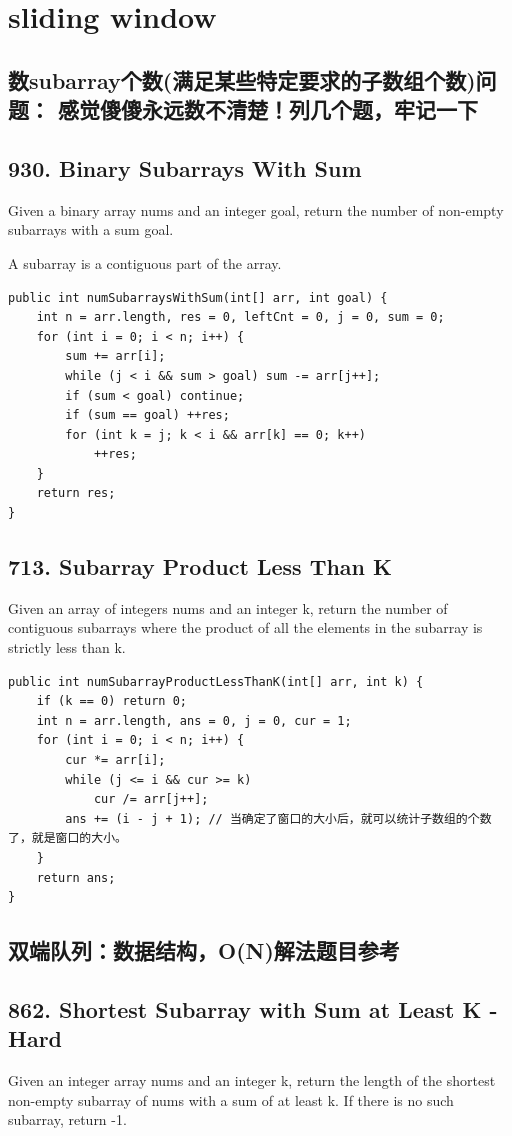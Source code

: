 \documentclass[9pt, b5paaper]{book}
\begin{document}
\chapter{sliding window}
\label{sec-12}
\section{数subarray个数(满足某些特定要求的子数组个数)问题： 感觉傻傻永远数不清楚！列几个题，牢记一下}
\label{sec-12-1}
\section{930. Binary Subarrays With Sum}
\label{sec-12-2}
Given a binary array nums and an integer goal, return the number of non-empty subarrays with a sum goal.

A subarray is a contiguous part of the array.
\begin{verbatim}
public int numSubarraysWithSum(int[] arr, int goal) { 
    int n = arr.length, res = 0, leftCnt = 0, j = 0, sum = 0;
    for (int i = 0; i < n; i++) {
        sum += arr[i];
        while (j < i && sum > goal) sum -= arr[j++];
        if (sum < goal) continue;
        if (sum == goal) ++res;
        for (int k = j; k < i && arr[k] == 0; k++) 
            ++res;
    }
    return res;
}
\end{verbatim}
\section{713. Subarray Product Less Than K}
\label{sec-12-3}
Given an array of integers nums and an integer k, return the number of contiguous subarrays where the product of all the elements in the subarray is strictly less than k.
\begin{verbatim}
public int numSubarrayProductLessThanK(int[] arr, int k) {
    if (k == 0) return 0;
    int n = arr.length, ans = 0, j = 0, cur = 1;
    for (int i = 0; i < n; i++) {
        cur *= arr[i];
        while (j <= i && cur >= k) 
            cur /= arr[j++];
        ans += (i - j + 1); // 当确定了窗口的大小后，就可以统计子数组的个数了，就是窗口的大小。
    }
    return ans;
}
\end{verbatim}
\section{双端队列：数据结构，O(N)解法题目参考}
\label{sec-12-4}
\section{862. Shortest Subarray with Sum at Least K - Hard}
\label{sec-12-5}
Given an integer array nums and an integer k, return the length of the shortest non-empty subarray of nums with a sum of at least k. If there is no such subarray, return -1.
\end{document}
